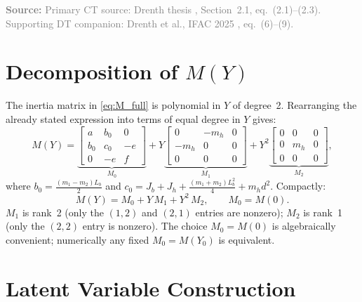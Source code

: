 \documentclass[11pt]{article}
\newcommand{\sourcenote}[1]{%
    \par\vspace{0.4em}%
    \textcolor{gray}{\footnotesize\textbf{Source:} #1}%
}
\begin{document}
\sourcenote{Primary CT source: Drenth thesis \cite{drenth2025thesis},
Section~2.1, eq.\ (2.1)--(2.3). Supporting DT companion: Drenth et al.,
IFAC 2025 \cite{drenth2025lpvlfr}, eq.\ (6)--(9).}

\section{Decomposition of \texorpdfstring{$M(Y)$}{M(Y)}}

The inertia matrix in \eqref{eq:M_full} is polynomial in $Y$ of degree~2.
Rearranging the already stated expression into terms of equal degree in $Y$ gives:
\begin{equation}
    M(Y) = \underbrace{\begin{bmatrix} a & b_0 & 0 \\ b_0 & c_0 & -e \\ 0 & -e & f \end{bmatrix}}_{M_0}
         + Y \underbrace{\begin{bmatrix} 0 & -m_h & 0 \\ -m_h & 0 & 0 \\ 0 & 0 & 0 \end{bmatrix}}_{M_1}
         + Y^2 \underbrace{\begin{bmatrix} 0 & 0 & 0 \\ 0 & m_h & 0 \\ 0 & 0 & 0 \end{bmatrix}}_{M_2},
    \label{eq:decomp}
\end{equation}
where $b_0 = \tfrac{(m_1-m_2)L_b}{2}$ and
$c_0 = J_b + J_h + \tfrac{(m_1+m_2)L_b^2}{4} + m_h d^2$.
Compactly:
\begin{equation}
    M(Y) = M_0 + Y\,M_1 + Y^2\,M_2, \qquad M_0 = M(0).
    \label{eq:decomp_short}
\end{equation}
$M_1$ is rank~2 (only the $(1,2)$ and $(2,1)$ entries are nonzero);
$M_2$ is rank~1 (only the $(2,2)$ entry is nonzero).
The choice $M_0 = M(0)$ is algebraically convenient; numerically any fixed
$M_0 = M(Y_0)$ is equivalent.

\section{Latent Variable Construction}
\end{document}
